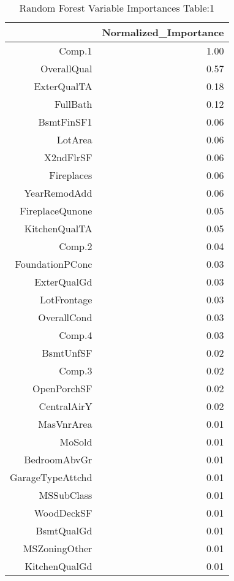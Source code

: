 \begin{table}[ht]
\centering
\begin{tabular}{rr}
  \hline
 & Normalized\_Importance \\ 
  \hline
Comp.1 & 1.00 \\ 
  OverallQual & 0.57 \\ 
  ExterQualTA & 0.18 \\ 
  FullBath & 0.12 \\ 
  BsmtFinSF1 & 0.06 \\ 
  LotArea & 0.06 \\ 
  X2ndFlrSF & 0.06 \\ 
  Fireplaces & 0.06 \\ 
  YearRemodAdd & 0.06 \\ 
  FireplaceQunone & 0.05 \\ 
  KitchenQualTA & 0.05 \\ 
  Comp.2 & 0.04 \\ 
  FoundationPConc & 0.03 \\ 
  ExterQualGd & 0.03 \\ 
  LotFrontage & 0.03 \\ 
  OverallCond & 0.03 \\ 
  Comp.4 & 0.03 \\ 
  BsmtUnfSF & 0.02 \\ 
  Comp.3 & 0.02 \\ 
  OpenPorchSF & 0.02 \\ 
  CentralAirY & 0.02 \\ 
  MasVnrArea & 0.01 \\ 
  MoSold & 0.01 \\ 
  BedroomAbvGr & 0.01 \\ 
  GarageTypeAttchd & 0.01 \\ 
  MSSubClass & 0.01 \\ 
  WoodDeckSF & 0.01 \\ 
  BsmtQualGd & 0.01 \\ 
  MSZoningOther & 0.01 \\ 
  KitchenQualGd & 0.01 \\ 
   \hline
\end{tabular}
\caption{Random Forest Variable Importances Table:1} 
\label{tab:importance1}
\end{table}

